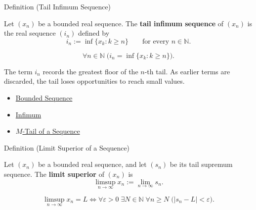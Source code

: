 \begin{definitionbox}{Definition (Tail Infimum Sequence)}
\begin{definition}
\label{def:tail-infimum-sequence}
Let $(x_n)$ be a bounded real sequence. The \textbf{tail infimum
sequence} of $(x_n)$ is the real sequence $(i_n)$ defined by
\[
  i_n:=\inf\{x_k:k\ge n\}
  \qquad\text{for every } n\in\mathbb{N}.
\]
\end{definition}
\end{definitionbox}

\begin{remark*}
\[
\forall n\in\mathbb{N}\;
\bigl(i_n=\inf\{x_k:k\ge n\}\bigr).
\]
\end{remark*}

\begin{remark*}[Interpretation]
The term $i_n$ records the greatest floor of the $n$-th tail. As earlier
terms are discarded, the tail loses opportunities to reach small values.
\end{remark*}

\begin{remark*}[Dependencies]\hfill
\begin{itemize}
  \item \hyperref[def:bounded-sequence]{Bounded Sequence}
  \item \hyperref[def:infimum]{Infimum}
  \item \hyperref[def:m-tail]{$M$-Tail of a Sequence}
\end{itemize}
\end{remark*}


\begin{definitionbox}{Definition (Limit Superior of a Sequence)}
\begin{definition}
\label{def:limsup-sequence}
Let $(x_n)$ be a bounded real sequence, and let $(s_n)$ be its tail
supremum sequence. The \textbf{limit superior} of $(x_n)$ is
\[
  \limsup_{n\to\infty}x_n:=\lim_{n\to\infty}s_n.
\]
\end{definition}
\end{definitionbox}

\begin{remark*}
\[
\limsup_{n\to\infty}x_n=L
\Longleftrightarrow
\forall \varepsilon>0\;\exists N\in\mathbb{N}\;\forall n\ge N
\;\bigl(|s_n-L|<\varepsilon\bigr).
\]
\end{remark*}

